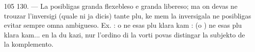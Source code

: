 \begin{VUpage}[109]{105}
\VUblanc{6.07pt}%
130. --- La  posibligas granda flexebleso e granda\nl
libereso; ma on devas ne trouzar l'inversigi (quale ni ja\nl
dicis) tante plu, ke mem la  inversigala ne posibligas\nl
evitar sempre omna ambigueso. Ex. : \cc
{} o  ne esas plu klara\nl
kam :  (o ) \nl
{} ne esas plu klara\nl
kam...  en la du kazi, nur l'ordino\nl
di la vorti povas distingar la subjekto de la komplemento.\parplein
\end{VUpage}

